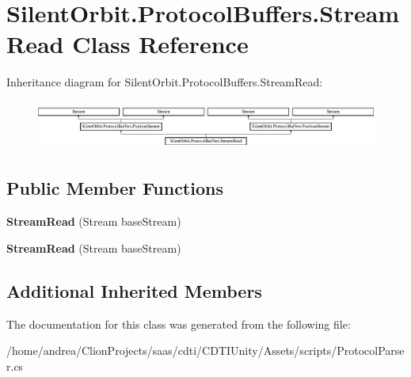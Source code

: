 \hypertarget{class_silent_orbit_1_1_protocol_buffers_1_1_stream_read}{}\section{Silent\+Orbit.\+Protocol\+Buffers.\+Stream\+Read Class Reference}
\label{class_silent_orbit_1_1_protocol_buffers_1_1_stream_read}
Inheritance diagram for Silent\+Orbit.\+Protocol\+Buffers.\+Stream\+Read\+:\begin{figure}[H]
\begin{center}
\leavevmode
\includegraphics[height=1.627907cm]{class_silent_orbit_1_1_protocol_buffers_1_1_stream_read}
\end{center}
\end{figure}
\subsection*{Public Member Functions}
\begin{DoxyCompactItemize}
\item 
{\bfseries Stream\+Read} (Stream base\+Stream)\hypertarget{class_silent_orbit_1_1_protocol_buffers_1_1_stream_read_a79f15b6f4801903fe6f4043e89d1b932}{}\label{class_silent_orbit_1_1_protocol_buffers_1_1_stream_read_a79f15b6f4801903fe6f4043e89d1b932}

\item 
{\bfseries Stream\+Read} (Stream base\+Stream)\hypertarget{class_silent_orbit_1_1_protocol_buffers_1_1_stream_read_a79f15b6f4801903fe6f4043e89d1b932}{}\label{class_silent_orbit_1_1_protocol_buffers_1_1_stream_read_a79f15b6f4801903fe6f4043e89d1b932}

\end{DoxyCompactItemize}
\subsection*{Additional Inherited Members}


The documentation for this class was generated from the following file\+:\begin{DoxyCompactItemize}
\item 
/home/andrea/\+Clion\+Projects/saas/cdti/\+C\+D\+T\+I\+Unity/\+Assets/scripts/Protocol\+Parser.\+cs\end{DoxyCompactItemize}
